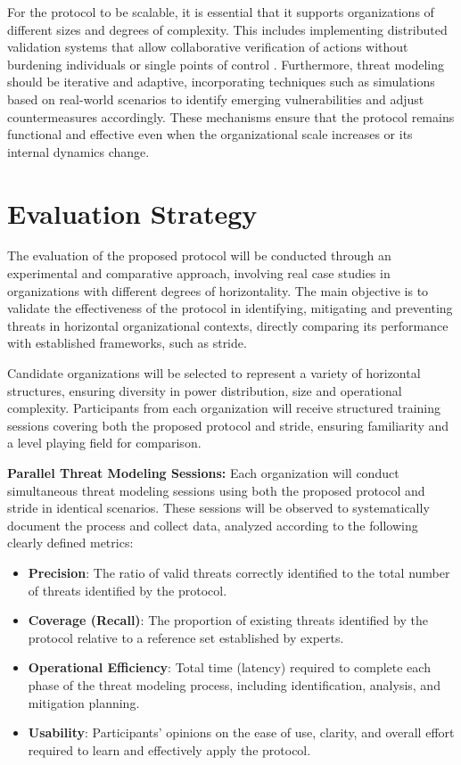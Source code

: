 For the protocol to be scalable, it is essential that it supports organizations
of different sizes and degrees of complexity. This includes implementing
distributed validation systems that allow collaborative verification of actions
without burdening individuals or single points of control \cite{Colbac}.
Furthermore, threat modeling should be iterative and adaptive, incorporating
techniques such as simulations based on real-world scenarios to identify
emerging vulnerabilities and adjust countermeasures accordingly. These
mechanisms ensure that the protocol remains functional and effective even when
the organizational scale increases or its internal dynamics change.

\section{Evaluation Strategy}
\label{sec:evaluation_strategy}

The evaluation of the proposed protocol will be conducted through an
experimental and comparative approach, involving real case studies in
organizations with different degrees of horizontality. The main objective is to
validate the effectiveness of the protocol in identifying, mitigating and
preventing threats in horizontal organizational contexts, directly comparing its
performance with established frameworks, such as \gls{stride}.

Candidate organizations will be selected to represent a variety of horizontal
structures, ensuring diversity in power distribution, size and operational
complexity. Participants from each organization will receive structured training
sessions covering both the proposed protocol and \gls{stride}, ensuring
familiarity and a level playing field for comparison.

\textbf{Parallel Threat Modeling Sessions:}
Each organization will conduct simultaneous threat modeling sessions using both
the proposed protocol and \gls{stride} in identical scenarios. These sessions
will be observed to systematically document the process and collect data,
analyzed according to the following clearly defined metrics:

\begin{itemize}
\item \textbf{Precision}: The ratio of valid threats correctly identified to the
total number of threats identified by the protocol.
\item \textbf{Coverage (Recall)}: The proportion of existing threats identified
by the protocol relative to a reference set established by experts.
\item \textbf{Operational Efficiency}: Total time (latency) required to complete
each phase of the threat modeling process, including identification, analysis,
and mitigation planning.
\item \textbf{Usability}: Participants' opinions on the ease of use, clarity,
and overall effort required to learn and effectively apply the protocol.
\end{itemize}


